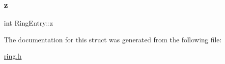 \mbox{\label{structRingEntry_a8b88d0f404a59333eae214698675c712}} 
\subsubsection{\texorpdfstring{z}{z}}
{\footnotesize\ttfamily int Ring\+Entry\+::z}



The documentation for this struct was generated from the following file\+:\begin{DoxyCompactItemize}
\item 
\hyperlink{ring_8h}{ring.\+h}\end{DoxyCompactItemize}

